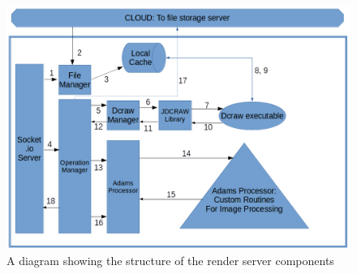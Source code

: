 \documentclass[12pt,a4paper]{article}
\begin{document}
\begin{figure}[h]
    \centering
    \includegraphics[width=1\textwidth]{renderserverdiagram}
    \caption{A diagram showing the structure of the render server components}
    \label{RenderServerDiagram}
\end{figure}
\end{document}
